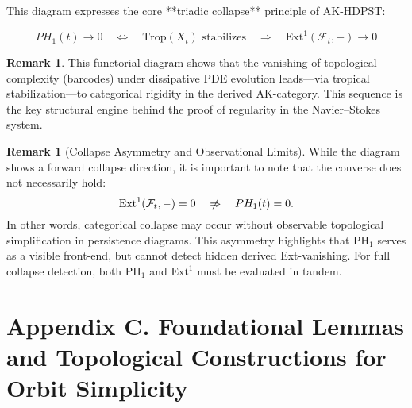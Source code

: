 \documentclass[11pt]{article}
\theoremstyle{definition}
\newtheorem{remark}[theorem]{Remark}
\begin{document}
\begin{center}
\end{center}

\vspace{0.5em}

This diagram expresses the core **triadic collapse** principle of AK-HDPST:

\[
PH_1(t) \to 0 \quad \Leftrightarrow \quad \text{Trop}(X_t) \text{ stabilizes} \quad \Rightarrow \quad \mathrm{Ext}^1(\mathcal{F}_t, -) \to 0
\]

\vspace{1em}

\begin{remark}
This functorial diagram shows that the vanishing of topological complexity (barcodes) under dissipative PDE evolution leads—via tropical stabilization—to categorical rigidity in the derived AK-category. This sequence is the key structural engine behind the proof of regularity in the Navier--Stokes system.
\end{remark}

\begin{remark}[Collapse Asymmetry and Observational Limits]
While the diagram shows a forward collapse direction, it is important to note that the converse does not necessarily hold:
\[
\mathrm{Ext}^1(\mathcal{F}_t, -) = 0 \quad \centernot\Rightarrow \quad PH_1(t) = 0.
\]
In other words, categorical collapse may occur without observable topological simplification in persistence diagrams.  
This asymmetry highlights that $\mathrm{PH}_1$ serves as a visible front-end, but cannot detect hidden derived Ext-vanishing.  
For full collapse detection, both $\mathrm{PH}_1$ and $\mathrm{Ext}^1$ must be evaluated in tandem.
\end{remark}



\section*{Appendix C. Foundational Lemmas and Topological Constructions for Orbit Simplicity}
\label{sec:appendixC}
\end{document}
